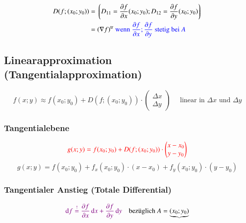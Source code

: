 \[
    \begin{split}
        D(f;(x_{0}; y_{0})) &= \left\lgroup D_{11} = \frac{\partial f}{\partial x}(x_{0}; y_{0}); 
                                            D_{12} = \frac{\partial f}{\partial y}(x_{0}; y_{0})\right\rgroup\\
        &= (\nabla f)^{\operatorname{tr}} \text{ {\color{blue}wenn $\frac{\partial f}{\partial x}; \frac{\partial f}{\partial y}$ stetig bei $A$}}
    \end{split}
\]



\subsection{Linearapproximation (Tangentialapproximation)}
\[
    f(x;y) \approx f(x_{0}; y_{0}) + D(f;(x_{0}; y_{0}))\cdot \begin{pmatrix}
        \Delta x\\
        \Delta y
    \end{pmatrix}
    \quad\text{ linear in $\Delta x$ und $\Delta y$}
\]


\subsubsection{Tangentialebene}
\[
    {\color{red}g(x; y) = f(x_{0}; y_{0}) + D(f;(x_{0}; y_{0}))\cdot \begin{pmatrix}
        x - x_{0}\\
        y - y_{0}
    \end{pmatrix}}
\]
\[
    g(x;y)=f(x_0;y_0)+f_x(x_0;y_0)\cdot(x-x_0)+f_y(x_0;y_0)\cdot(y-y_0)
\]

\subsubsection{Tangentialer Anstieg (Totale Differential)}
\[
    \cvt{\diff f \overset{!}{=} 
        \frac{\partial f}{\partial \tikznode{ptx}{x}}\diff x + 
        \frac{\partial f}{\partial \tikznode{pty}{y}}\diff y} 
        \quad \text{bezüglich } A=\underbrace{(x_{0}; y_{0})}_{\tikznode{axy}{}}
\]


